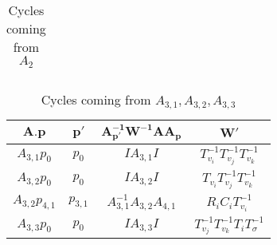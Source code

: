 \documentclass{article}[12pt]
\begin{document}
\begin{table}[h]
\begin{center}
{\begin{tabular}{|c|c|c|c|}


\hline


\end{tabular}
}
\end{center}
\caption{Cycles coming from $A_2$}
\end{table}





\begin{table}[h]\label{hurwitztableA3}
  \begin{center}
  {\renewcommand{\arraystretch}{1.2}%
\begin{tabular}{|c|c|c|c|}
\hline 
$\mathbf{A.p}$ & $\mathbf{p'}$ & $\mathbf{A_{p'}^{-1}W^{-1}A A_p}$ & $\mathbf{W'}$  \\
\hline


$A_{3,1} p_0$ & $p_0$ & $IA_{3,1}I$ & $T_{v_i}^{-1}T_{v_j}^{-1}T_{v_k}^{-1}$\\
\hline

$A_{3,2} p_0$ & $p_0$ & $IA_{3,2}I$ & $T_{v_i}T_{v_j}^{-1}T_{v_k}^{-1}$\\
\hline


$A_{3,2} p_{4,1}$ & $p_{3,1}$ & $A_{3,1}^{-1}A_{3,2}A_{4,1}$ & $R_iC_iT_{v_i}^{-1}$\\
\hline

$A_{3,3} p_0$ & $p_0$ & $IA_{3,3}I$ & $T_{v_j}^{-1}T_{v_k}^{-1}T_iT_\sigma^{-1}$\\
\hline

\end{tabular}
}
\end{center}
\caption{Cycles coming from $A_{3,1}, A_{3,2}, A_{3,3}$}
\end{table}
\end{document}
